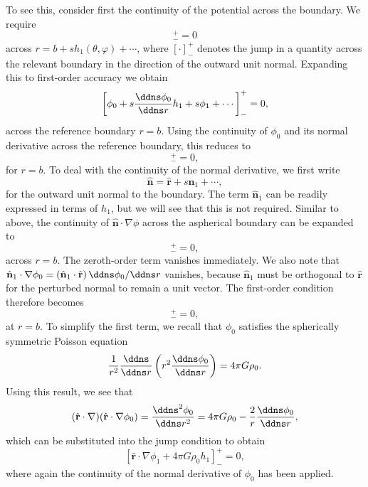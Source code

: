 To see this, consider first the continuity of the potential across the boundary. We require
\begin{equation*}
    [\phi]_{-}^{+}=0
\end{equation*}
across $r=b+sh_{1}(\theta,\varphi)+\cdots$, where $[\cdot]_{-}^{+}$ denotes the jump in a quantity across the relevant boundary in the direction of the outward unit normal. Expanding this to first-order accuracy we obtain
\begin{equation*}
    \left[\phi_{0}+s\frac{\ddns\phi_{0}}{\ddns r}h_{1}+s\phi_{1}+\cdots\right]_{-}^{+}=0,
\end{equation*}
across the reference boundary $r=b$. Using the continuity of $\phi_{0}$ and its normal derivative across the reference boundary, this reduces to
\begin{equation*}
    [\phi_{1}]_{-}^{+}=0,
\end{equation*}
for $r=b$. To deal with the continuity of the normal derivative, we first write
\begin{equation*}
    \hat{\mathbf{n}}=\hat{\mathbf{r}}+s\hat{\mathbf{n}}_{1}+\cdots,
\end{equation*}
for the outward unit normal to the boundary. The term $\hat{\mathbf{n}}_{1}$ can be readily expressed in terms of $h_{1}$, but we will see that this is not required. Similar to above, the continuity of $\hat{\mathbf{n}}\cdot\nabla\phi$ across the aspherical boundary can be expanded to
\begin{equation*}
    [\hat{\mathbf{r}}\cdot\nabla\phi_{0}+s(\hat{\mathbf{r}}\cdot\nabla)(\hat{\mathbf{r}}\cdot\nabla\phi_{0})h_{1}+s\hat{\mathbf{n}}_{1}\cdot\nabla\phi_{0}+s\hat{\mathbf{r}}\cdot\nabla\phi_{1}+\cdots]_{-}^{+}=0,
\end{equation*}
across $r=b$. The zeroth-order term vanishes immediately. We also note that $\hat{\mathbf{n}}_{1}\cdot\nabla\phi_{0}=(\hat{\mathbf{n}}_{1}\cdot\hat{\mathbf{r}})\,\ddns\phi_{0}/\ddns r$ vanishes, because $\hat{\mathbf{n}}_{1}$ must be orthogonal to $\hat{\mathbf{r}}$ for the perturbed normal to remain a unit vector. The first-order condition therefore becomes
\begin{equation*}
    [(\hat{\mathbf{r}}\cdot\nabla)(\hat{\mathbf{r}}\cdot\nabla\phi_{0})h_{1}+\hat{\mathbf{r}}\cdot\nabla\phi_{1}]_{-}^{+}=0,
\end{equation*}
at $r=b$. To simplify the first term, we recall that $\phi_{0}$ satisfies the spherically symmetric Poisson equation
\begin{equation*}
    \frac{1}{r^{2}}\frac{\ddns}{\ddns r}\left(r^{2}\frac{\ddns\phi_{0}}{\ddns r}\right)=4\pi G\rho_{0}.
\end{equation*}
Using this result, we see that
\begin{equation*}
    (\hat{\mathbf{r}}\cdot\nabla)(\hat{\mathbf{r}}\cdot\nabla\phi_{0}) = \frac{\ddns^{2}\phi_{0}}{\ddns r^{2}}=4\pi G\rho_{0}-\frac{2}{r}\frac{\ddns\phi_{0}}{\ddns r},
\end{equation*}
which can be substituted into the jump condition to obtain
\begin{equation*}
    \left[\hat{\mathbf{r}}\cdot\nabla\phi_{1}+4\pi G\rho_{0}h_{1}\right]_{-}^{+}=0,
\end{equation*}
where again the continuity of the normal derivative of $\phi_{0}$ has been applied.
